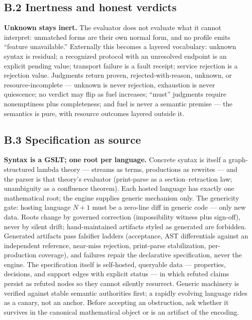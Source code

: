 \documentclass[11pt]{article}
\begin{document}
\subsection*{B.2 Inertness and honest verdicts}
\textbf{Unknown stays inert.}  The evaluator does not evaluate what it
cannot interpret: unmatched forms are their own normal form, and no
profile emits ``feature unavailable.''  Externally this becomes a layered
vocabulary: unknown syntax is residual; a recognized protocol with an
unresolved endpoint is an explicit pending value; transport failure is a
fault receipt; service rejection is a rejection value.  Judgments return
proven, rejected-with-reason, unknown, or resource-incomplete ---
unknown is never rejection, exhaustion is never quiescence; no verdict
may flip as fuel increases; ``must'' judgments require nonemptiness plus
completeness; and fuel is never a semantic premise --- the semantics is
pure, with resource outcomes layered outside it.

\subsection*{B.3 Specification as source}
\textbf{Syntax is a GSLT; one root per language.}  Concrete syntax is
itself a graph-structured lambda theory --- streams as terms, productions
as rewrites --- and the parser is that theory's evaluator (print-parse as
a section--retraction law; unambiguity as a confluence theorem).  Each
hosted language has exactly one mathematical root; the engine supplies
generic mechanism only.  The genericity gate: hosting language $N{+}1$
must be a zero-line diff in generic code --- only new data.  Roots change
by governed correction (impossibility witness plus sign-off), never by
silent drift; hand-maintained artifacts styled as generated are forbidden.
Generated artifacts pass falsifier ladders (acceptance, AST differentials
against an independent reference, near-miss rejection, print-parse
stabilization, per-production coverage), and failures repair the
declarative specification, never the engine.  The specification itself is
self-hosted, queryable data --- properties, decisions, and support edges
with explicit status --- in which refuted claims persist as refuted nodes
so they cannot silently resurrect.  Generic machinery is verified against
stable semantic authorities first; a rapidly evolving language rides as a
canary, not an anchor.  Before accepting an obstruction, ask whether it
survives in the canonical mathematical object or is an artifact of the
encoding.
\end{document}
